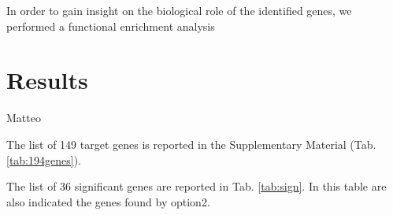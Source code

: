 \documentclass[fleqn,10pt]{SelfArx} %
\begin{document}
In order to gain insight on the biological role of the identified genes, we performed a functional enrichment analysis 


\section*{Results}
Matteo

The list of 149 target genes is reported in the Supplementary Material (Tab. \ref{tab:194genes}).

The list of 36 significant genes are reported in Tab. \ref{tab:sign}. In this table are also indicated the genes found by option2.

\renewcommand{\arraystretch}{1.1}

\end{document}
